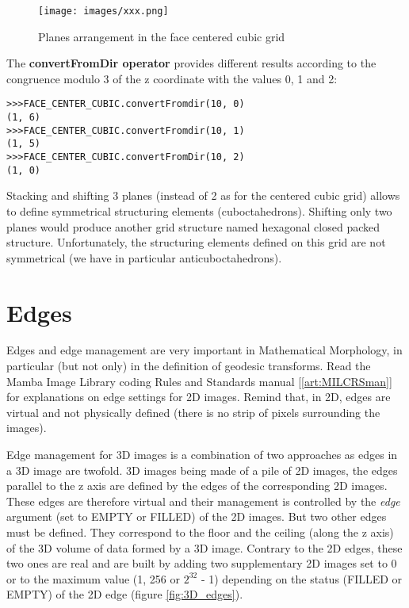 \documentclass[a4paper,10pt,oneside]{article}
\begin{document}
\begin{figure}
\centering
\texttt{[image: images/xxx.png]}
\caption{Planes arrangement in the face centered cubic grid}
\label{fig:FCC_grid}
\end{figure}

The \textbf{convertFromDir operator} provides different results according to the congruence modulo 3 of the z coordinate with the values
0, 1 and 2:

\lstset{language=Python}
\begin{lstlisting}
>>>FACE_CENTER_CUBIC.convertFromdir(10, 0)
(1, 6)
>>>FACE_CENTER_CUBIC.convertFromdir(10, 1)
(1, 5)
>>>FACE_CENTER_CUBIC.convertFromDir(10, 2)
(1, 0)
\end{lstlisting}

Stacking and shifting 3 planes (instead of 2 as for the centered cubic grid) allows to define symmetrical structuring elements (cuboctahedrons).
Shifting only two planes would produce another grid structure named hexagonal closed packed structure. Unfortunately, the structuring
elements defined on this grid are not symmetrical (we have in particular anticuboctahedrons).

\section{Edges}
Edges and edge management are very important in Mathematical Morphology, in particular (but not only) in  the definition of geodesic transforms.
Read the Mamba Image Library coding Rules and Standards manual [\ref{art:MILCRSman}] for explanations on edge settings for 2D images. Remind that,
in 2D, edges are virtual and not physically defined (there is no strip of pixels surrounding the images).

Edge management for 3D images is a combination of two approaches as edges in a 3D image are twofold. 3D images being made of a pile of 2D
images, the edges parallel to the z axis are defined by the edges of the corresponding 2D images. These edges are therefore virtual and their management
is controlled by the \textit{edge} argument (set to EMPTY or FILLED) of the 2D images. But two other edges must be defined. They correspond
to the floor and the ceiling (along the z axis) of the 3D volume of data formed by a 3D image. Contrary to the 2D edges, these two ones are
real and are built by adding two supplementary 2D images set to 0 or to the maximum value (1, 256 or $2^{32}$ - 1) depending on the status (FILLED or EMPTY)
of the 2D edge (figure \ref{fig:3D_edges}).
\end{document}
